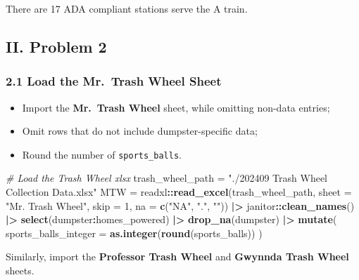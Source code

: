 \documentclass[
]{article}
\newenvironment{Shaded}{\begin{snugshade}}{\end{snugshade}}
\newcommand{\AttributeTok}[1]{\textcolor[rgb]{0.13,0.29,0.53}{#1}}
\newcommand{\CommentTok}[1]{\textcolor[rgb]{0.56,0.35,0.01}{\textit{#1}}}
\newcommand{\DecValTok}[1]{\textcolor[rgb]{0.00,0.00,0.81}{#1}}
\newcommand{\FunctionTok}[1]{\textcolor[rgb]{0.13,0.29,0.53}{\textbf{#1}}}
\newcommand{\NormalTok}[1]{#1}
\newcommand{\OtherTok}[1]{\textcolor[rgb]{0.56,0.35,0.01}{#1}}
\newcommand{\SpecialCharTok}[1]{\textcolor[rgb]{0.81,0.36,0.00}{\textbf{#1}}}
\newcommand{\StringTok}[1]{\textcolor[rgb]{0.31,0.60,0.02}{#1}}
\providecommand{\tightlist}{%
  \setlength{\itemsep}{0pt}\setlength{\parskip}{0pt}}
\begin{document}
There are 17 ADA compliant stations serve the A train.

\subsection{II. Problem 2}\label{ii.-problem-2}

\subsubsection{2.1 Load the Mr.~Trash Wheel
Sheet}\label{load-the-mr.-trash-wheel-sheet}

\begin{itemize}
\tightlist
\item
  Import the \textbf{Mr.~Trash Wheel} sheet, while omitting non-data
  entries;
\item
  Omit rows that do not include dumpster-specific data;
\item
  Round the number of \texttt{sports\_balls}.
\end{itemize}

\begin{Shaded}
\begin{Highlighting}[]
\CommentTok{\# Load the Trash Wheel xlsx}
\NormalTok{trash\_wheel\_path }\OtherTok{=} \StringTok{"./202409 Trash Wheel Collection Data.xlsx"}
\NormalTok{MTW }\OtherTok{=} 
\NormalTok{  readxl}\SpecialCharTok{::}\FunctionTok{read\_excel}\NormalTok{(trash\_wheel\_path, }\AttributeTok{sheet =} \StringTok{"Mr. Trash Wheel"}\NormalTok{, }
                     \AttributeTok{skip =} \DecValTok{1}\NormalTok{, }\AttributeTok{na =} \FunctionTok{c}\NormalTok{(}\StringTok{"NA"}\NormalTok{, }\StringTok{"."}\NormalTok{, }\StringTok{""}\NormalTok{)) }\SpecialCharTok{|\textgreater{}}
\NormalTok{  janitor}\SpecialCharTok{::}\FunctionTok{clean\_names}\NormalTok{() }\SpecialCharTok{|\textgreater{}}
  \FunctionTok{select}\NormalTok{(dumpster}\SpecialCharTok{:}\NormalTok{homes\_powered) }\SpecialCharTok{|\textgreater{}}
  \FunctionTok{drop\_na}\NormalTok{(dumpster) }\SpecialCharTok{|\textgreater{}}
  \FunctionTok{mutate}\NormalTok{(}
    \AttributeTok{sports\_balls\_integer =} \FunctionTok{as.integer}\NormalTok{(}\FunctionTok{round}\NormalTok{(sports\_balls))}
\NormalTok{    )}
\end{Highlighting}
\end{Shaded}

Similarly, import the \textbf{Professor Trash Wheel} and \textbf{Gwynnda
Trash Wheel} sheets.
\end{document}

